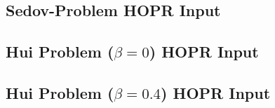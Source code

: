 \begin{appendices}
\subsection{Sedov-Problem HOPR Input}\label{ssec:hoprin-sedov}


\subsection{Hui Problem ($\beta = 0$) HOPR Input}\label{ssec:hoprin-hui-Rot0}


\subsection{Hui Problem ($\beta = 0.4$) HOPR Input}\label{ssec:hoprin-hui-Rot}


\end{appendices}
